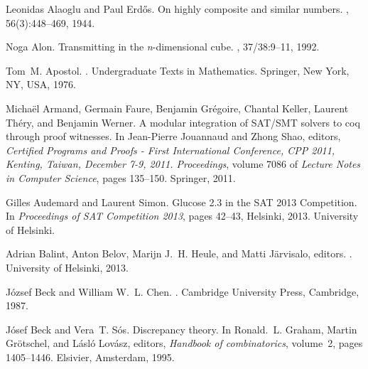 \documentclass{article} \usepackage[utf8]{inputenc}
\begin{document}
\begin{thebibliography}{}

Leonidas Alaoglu and Paul Erd{\H{o}}s.
\newblock On highly composite and similar numbers.
,
  56(3):448--469, 1944.

Noga Alon.
\newblock Transmitting in the {\it n}-dimensional cube.
, 37/38:9--11, 1992.

Tom~M. Apostol.
.
\newblock Undergraduate Texts in Mathematics. Springer, New York, NY, USA,
  1976.

Micha{\"e}l Armand, Germain Faure, Benjamin Gr{\'e}goire, Chantal Keller,
  Laurent Th{\'e}ry, and Benjamin Werner.
\newblock A modular integration of SAT/SMT solvers to coq through proof
  witnesses.
\newblock In Jean-Pierre Jouannaud and Zhong Shao, editors, {\em Certified
  Programs and Proofs - First International Conference, CPP 2011, Kenting,
  Taiwan, December 7-9, 2011. Proceedings}, volume 7086 of {\em Lecture Notes
  in Computer Science}, pages 135--150. Springer, 2011.

Gilles Audemard and Laurent Simon.
\newblock Glucose 2.3 in the {SAT} 2013 {C}ompetition.
\newblock In {\em Proceedings of SAT Competition 2013}, pages 42--43, Helsinki,
  2013. University of Helsinki.

Adrian Balint, Anton Belov, Marijn J.~H. Heule, and Matti J\"arvisalo, editors.
. University of Helsinki,
  2013.

J{\'{o}}zsef Beck and William W.~L. Chen.
.
\newblock Cambridge University Press, Cambridge, 1987.

J{\'o}sef Beck and Vera~T. S{\'o}s.
\newblock Discrepancy theory.
\newblock In Ronald.~L. Graham, Martin Gr{\"o}tschel, and L{\'a}sl{\'o}
  Lov{\'a}sz, editors, {\em Handbook of combinatorics}, volume~2, pages
  1405--1446. Elsivier, Amsterdam, 1995.


\end{thebibliography}
\end{document}
